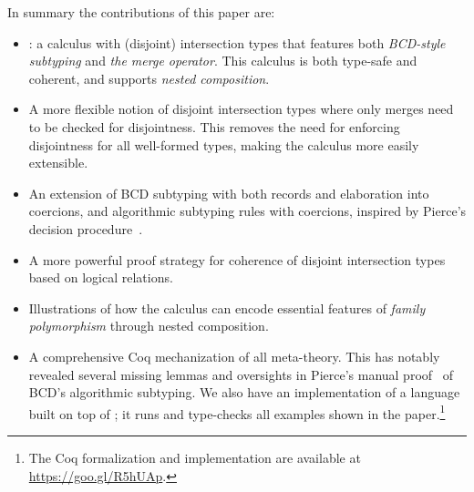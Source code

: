 In summary the contributions of this paper are:
\begin{itemize}

\item \name: a calculus with (disjoint) intersection types
that features both \emph{BCD-style subtyping} and \emph{the merge operator}.
This calculus is both type-safe and coherent, and supports \emph{nested
composition}. 

\item A more flexible notion of disjoint intersection types where 
only merges need to be checked for disjointness. This removes the need 
for enforcing disjointness for all well-formed types, making the
calculus more easily extensible.

\item An extension of BCD subtyping with both records and elaboration into coercions, 
  and
  algorithmic subtyping rules with coercions, inspired by
  Pierce's decision
  procedure~\cite{pierce1989decision}.

\item A more powerful proof strategy for coherence of disjoint
  intersection types based on logical
  relations. 

\item Illustrations of how the calculus can encode essential features 
of \emph{family polymorphism} through nested composition.

\item A comprehensive Coq mechanization of all meta-theory. This has notably revealed
  several missing lemmas and oversights
  in Pierce's manual proof~\cite{pierce1989decision} of BCD's algorithmic
  subtyping. %
  We also have an implementation of a language built on top of \name; it runs and type-checks all examples shown in
  the paper.\footnote{The Coq formalization and implementation are available at \url{https://goo.gl/R5hUAp}.}


\end{itemize}

